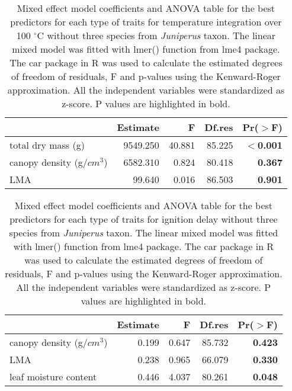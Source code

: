 \documentclass[12pt]{report}
\begin{document}
\begin{table}
\centering
\caption{Mixed effect model coefficients and ANOVA table for the best predictors for each type of traits for temperature integration over 100 $^{\circ}$C without three species from \emph{Juniperus} taxon. The linear mixed model was fitted with lmer() function from lme4 package. The car package in R  was used to calculate the estimated degrees of freedom of residuals, F and p-values using the Kenward-Roger approximation. All the independent variables were standardized  as z-score. P values are highlighted in bold.}
\vspace{0.5 cm}
\begin{tabular}{lrrrr}
  \hline
 &  Estimate & F  & Df.res & Pr($>$F) \\ 
  \hline 
  total dry mass (g) & 9549.250 & 40.881  & 85.225 & \textbf{$<$0.001} \\ 
  canopy density (g/{$cm^3$}) & 6582.310 & 0.824  & 80.418 & \textbf{0.367} \\ 
  LMA & 99.640 & 0.016 &  86.503 & \textbf{0.901} \\ 
   \hline
\end{tabular}
\end{table}



\begin{table}
\centering
\caption{Mixed effect model coefficients and ANOVA table for the best predictors for each type of traits for ignition delay without three species from \emph{Juniperus} taxon. The linear mixed model was fitted with lmer() function from lme4 package. The car package in R  was used to calculate the estimated degrees of freedom of residuals, F and p-values using the Kenward-Roger approximation. All the independent variables were standardized  as z-score. P values are highlighted in bold.}
\vspace{0.5 cm}
\begin{tabular}{lrrrr}
  \hline
 &  Estimate & F  & Df.res & Pr($>$F) \\ 
  \hline 
  canopy density (g/{$cm^3$}) & 0.199 &  0.647 & 85.732 & \textbf{0.423} \\ 
  LMA  & 0.238 & 0.965 & 66.079 & \textbf{0.330} \\ 
  leaf moisture content & 0.446 & 4.037 & 80.261  & \textbf{0.048} \\ 
   \hline
\end{tabular}
\end{table}
\end{document}
